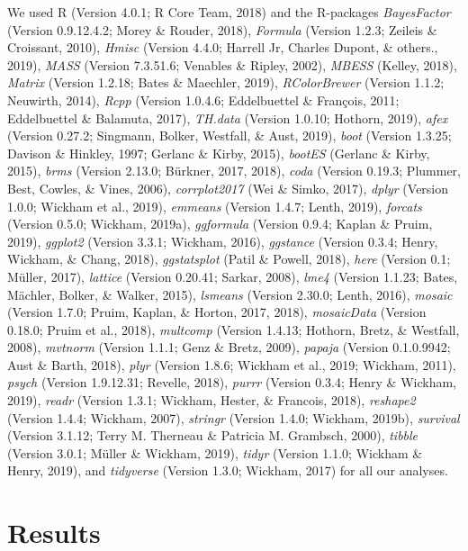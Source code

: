 \documentclass[
  english,
  man]{apa6}
\begin{document}
We used R (Version 4.0.1; R Core Team, 2018) and the R-packages \emph{BayesFactor} (Version 0.9.12.4.2; Morey \& Rouder, 2018), \emph{Formula} (Version 1.2.3; Zeileis \& Croissant, 2010), \emph{Hmisc} (Version 4.4.0; Harrell Jr, Charles Dupont, \& others., 2019), \emph{MASS} (Version 7.3.51.6; Venables \& Ripley, 2002), \emph{MBESS} (Kelley, 2018), \emph{Matrix} (Version 1.2.18; Bates \& Maechler, 2019), \emph{RColorBrewer} (Version 1.1.2; Neuwirth, 2014), \emph{Rcpp} (Version 1.0.4.6; Eddelbuettel \& François, 2011; Eddelbuettel \& Balamuta, 2017), \emph{TH.data} (Version 1.0.10; Hothorn, 2019), \emph{afex} (Version 0.27.2; Singmann, Bolker, Westfall, \& Aust, 2019), \emph{boot} (Version 1.3.25; Davison \& Hinkley, 1997; Gerlanc \& Kirby, 2015), \emph{bootES} (Gerlanc \& Kirby, 2015), \emph{brms} (Version 2.13.0; Bürkner, 2017, 2018), \emph{coda} (Version 0.19.3; Plummer, Best, Cowles, \& Vines, 2006), \emph{corrplot2017} (Wei \& Simko, 2017), \emph{dplyr} (Version 1.0.0; Wickham et al., 2019), \emph{emmeans} (Version 1.4.7; Lenth, 2019), \emph{forcats} (Version 0.5.0; Wickham, 2019a), \emph{ggformula} (Version 0.9.4; Kaplan \& Pruim, 2019), \emph{ggplot2} (Version 3.3.1; Wickham, 2016), \emph{ggstance} (Version 0.3.4; Henry, Wickham, \& Chang, 2018), \emph{ggstatsplot} (Patil \& Powell, 2018), \emph{here} (Version 0.1; Müller, 2017), \emph{lattice} (Version 0.20.41; Sarkar, 2008), \emph{lme4} (Version 1.1.23; Bates, Mächler, Bolker, \& Walker, 2015), \emph{lsmeans} (Version 2.30.0; Lenth, 2016), \emph{mosaic} (Version 1.7.0; Pruim, Kaplan, \& Horton, 2017, 2018), \emph{mosaicData} (Version 0.18.0; Pruim et al., 2018), \emph{multcomp} (Version 1.4.13; Hothorn, Bretz, \& Westfall, 2008), \emph{mvtnorm} (Version 1.1.1; Genz \& Bretz, 2009), \emph{papaja} (Version 0.1.0.9942; Aust \& Barth, 2018), \emph{plyr} (Version 1.8.6; Wickham et al., 2019; Wickham, 2011), \emph{psych} (Version 1.9.12.31; Revelle, 2018), \emph{purrr} (Version 0.3.4; Henry \& Wickham, 2019), \emph{readr} (Version 1.3.1; Wickham, Hester, \& Francois, 2018), \emph{reshape2} (Version 1.4.4; Wickham, 2007), \emph{stringr} (Version 1.4.0; Wickham, 2019b), \emph{survival} (Version 3.1.12; Terry M. Therneau \& Patricia M. Grambsch, 2000), \emph{tibble} (Version 3.0.1; Müller \& Wickham, 2019), \emph{tidyr} (Version 1.1.0; Wickham \& Henry, 2019), and \emph{tidyverse} (Version 1.3.0; Wickham, 2017) for all our analyses.

\hypertarget{results}{%
\section{Results}\label{results}}
\end{document}
